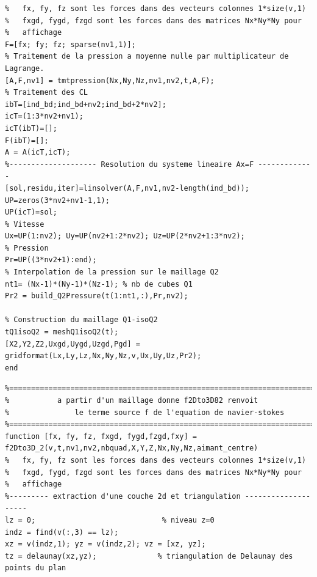 \documentclass[a4paper,12pt,titlepage]{report}
\begin{document}
\begin{onehalfspace}
\begin{appendix}
\begin{verbatim}
%   fx, fy, fz sont les forces dans des vecteurs colonnes 1*size(v,1)
%   fxgd, fygd, fzgd sont les forces dans des matrices Nx*Ny*Ny pour
%   affichage
F=[fx; fy; fz; sparse(nv1,1)];
% Traitement de la pression a moyenne nulle par multiplicateur de Lagrange.
[A,F,nv1] = tmtpression(Nx,Ny,Nz,nv1,nv2,t,A,F);
% Traitement des CL
ibT=[ind_bd;ind_bd+nv2;ind_bd+2*nv2];
icT=(1:3*nv2+nv1);
icT(ibT)=[];
F(ibT)=[];
A = A(icT,icT);
%-------------------- Resolution du systeme lineaire Ax=F -------------
[sol,residu,iter]=linsolver(A,F,nv1,nv2-length(ind_bd));
UP=zeros(3*nv2+nv1-1,1);
UP(icT)=sol;
% Vitesse
Ux=UP(1:nv2); Uy=UP(nv2+1:2*nv2); Uz=UP(2*nv2+1:3*nv2);
% Pression
Pr=UP((3*nv2+1):end);
% Interpolation de la pression sur le maillage Q2
nt1= (Nx-1)*(Ny-1)*(Nz-1); % nb de cubes Q1
Pr2 = build_Q2Pressure(t(1:nt1,:),Pr,nv2);

% Construction du maillage Q1-isoQ2
tQ1isoQ2 = meshQ1isoQ2(t); 
[X2,Y2,Z2,Uxgd,Uygd,Uzgd,Pgd] = gridformat(Lx,Ly,Lz,Nx,Ny,Nz,v,Ux,Uy,Uz,Pr2);
end
\end{verbatim}

\begin{verbatim}
%==========================================================================
%     		a partir d'un maillage donne f2Dto3D82 renvoit 
%   			le terme source f de l'equation de navier-stokes
%==========================================================================
function [fx, fy, fz, fxgd, fygd,fzgd,fxy] = 
f2Dto3D_2(v,t,nv1,nv2,nbquad,X,Y,Z,Nx,Ny,Nz,aimant_centre)
%   fx, fy, fz sont les forces dans des vecteurs colonnes 1*size(v,1)
%   fxgd, fygd, fzgd sont les forces dans des matrices Nx*Ny*Ny pour
%   affichage
%--------- extraction d'une couche 2d et triangulation --------------------
lz = 0;                             % niveau z=0
indz = find(v(:,3) == lz);
xz = v(indz,1); yz = v(indz,2); vz = [xz, yz];
tz = delaunay(xz,yz);              % triangulation de Delaunay des points du plan 


\end{verbatim}
\end{appendix}
\end{onehalfspace}
\end{document}
